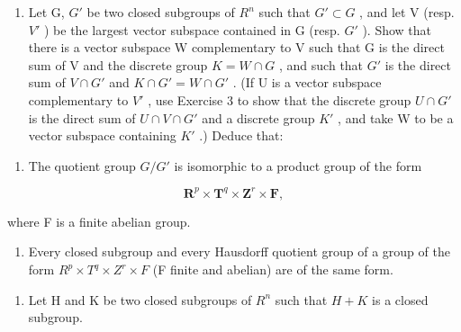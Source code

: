 \begin{enumerate}
\item
  Let G, \(G'\) be two closed subgroups of \(R^{n}\) such that \(G' \subset G\) , and let V (resp. \(V'\) ) be the largest vector subspace contained in G (resp. \(G'\) ). Show that there is a vector subspace W complementary to V such that G is the direct sum of V and the discrete group \(K = W \cap G\) , and such that \(G'\) is the direct sum of \(V \cap G'\) and \(K \cap G' = W \cap G'\) . (If U is a vector subspace complementary to \(V'\) , use Exercise 3 to show that the discrete group \(U \cap G'\) is the direct sum of \(U \cap V \cap G'\) and a discrete group \(K'\) , and take W to be a vector subspace containing \(K'\) .) Deduce that:
\end{enumerate}

\begin{enumerate}
\def\labelenumi{\alph{enumi})}
\tightlist
\item
  The quotient group \(G/G'\) is isomorphic to a product group of the form
\end{enumerate}

\[
\mathbf {R} ^ {p} \times \mathbf {T} ^ {q} \times \mathbf {Z} ^ {r} \times \mathbf {F},
\]

where F is a finite abelian group.

\begin{enumerate}
\def\labelenumi{\alph{enumi})}
\setcounter{enumi}{1}
\tightlist
\item
  Every closed subgroup and every Hausdorff quotient group of a group of the form \(R^{p} \times T^{q} \times Z^{r} \times F\) (F finite and abelian) are of the same form.
\end{enumerate}

\begin{enumerate}
\def\labelenumi{\arabic{enumi})}
\setcounter{enumi}{5}
\tightlist
\item
  Let H and K be two closed subgroups of \(R^{n}\) such that \(H + K\) is a closed subgroup.
\end{enumerate}

